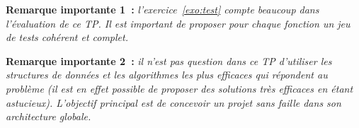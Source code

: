 \documentclass[12pt]{article}
\theoremstyle{definition}
\begin{document}
{\bf Remarque importante 1~:} {\it l'exercice~\ref{exo:test} compte beaucoup
dans l'évaluation de ce TP. Il est important de proposer pour chaque 
fonction un jeu de tests cohérent et complet.}
\bigskip

{\bf Remarque importante 2~:} {\it il n'est pas question dans ce TP 
d'utiliser les structures de données et les algorithmes les plus efficaces
qui répondent au problème (il est en effet possible de proposer des 
solutions très efficaces en étant astucieux). L'objectif principal est 
de concevoir un projet sans faille dans son architecture globale.}
\end{document}
